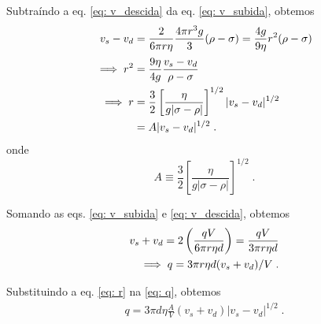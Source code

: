 Subtraíndo a eq. \eqref{eq: v_descida} da eq. \eqref{eq: v_subida}, obtemos
\begin{align}
v_s - v_d &= \frac{2}{6 \pi r \eta} \frac{4 \pi r^3 g}{3} (\rho - \sigma) \notag = \frac{4g}{9\eta} r^2 (\rho - \sigma) \notag \\[2pt]
\implies r^2 &= \frac{9 \eta}{4 g} \frac{v_s - v_d}{\rho - \sigma} \notag \\
\implies r &= \frac{3}{2} \left[ \frac{\eta}{g|\sigma - \rho|} \right]^{1/2} |v_s - v_d|^{1/2} \notag \\
&= A |v_s - v_d|^{1/2}\;.
\label{eq: r}
\end{align}
onde
\begin{equation}
A \equiv \frac{3}{2} \left[ \frac{\eta}{g|\sigma - \rho|} \right]^{1/2} \;.
\end{equation}

Somando as eqs. \eqref{eq: v_subida} e \eqref{eq: v_descida}, obtemos
\begin{align}
v_s + v_d = 2\left( \frac{qV}{6 \pi r \eta d} \right) = \frac{qV}{3 \pi r \eta d} \notag \\
\implies q = 3\pi r \eta d (v_s + v_d)/V \;.
\label{eq: q}
\end{align}

Substituindo a eq. \eqref{eq: r} na \eqref{eq: q}, obtemos
\begin{gather}
q = 3\pi d \eta \frac{A}{V} (v_s + v_d) |v_s - v_d|^{1/2} \;.
\label{eq: q'}
\end{gather}
